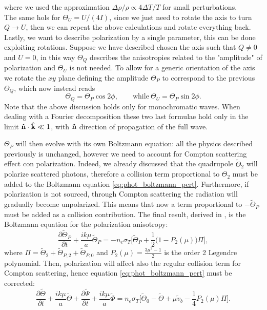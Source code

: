 where we used the approximation $\Delta\rho/\rho\propto4\Delta T/T$ for small perturbations.\\The same hols for $\Theta_U=U/(4I)$, since we just need to rotate the axis to turn $Q\rightarrow U$, then we can repeat the above calculations and rotate everything back.\\ Lastly, we want to describe polarization by a single parameter, this can be done exploiting rotations. Suppose we have described chosen the axis such that $Q\neq0$ and $U=0$, in this way $\Theta_Q$ describes the anisotropies related to the "amplitude" of polarization and $\Theta_U$ is not needed. To allow for a generic orientation of the axis we rotate the $xy$ plane defining the amplitude $\Theta_P$ to correspond to the previous $\Theta_Q$, which now instead reads
$$\Theta_Q=\Theta_P\cos2\phi,\qquad\text{while}\  \Theta_U=\Theta_P\sin2\phi.$$
Note that the above discussion holds only for monochromatic waves. When dealing with a Fourier decomposition these two last formulae hold only in the limit $\mathbf{\hat{n}}\cdot\mathbf{\hat{k}}\ll1$, with $\mathbf{\hat{n}}$ direction of propagation of the full wave.

$\Theta_P$ will then evolve with its own Boltzmann equation:
all the physics described previously is unchanged, however we need to account for Compton scattering effect con polarization. Indeed, we already discussed that the quadrupole $\tilde{\Theta}_2$ will polarize scattered photons, therefore a collision term proportional to $\Theta_2$ must be added to the Boltzmann equation \eqref{eq:phot_boltzmann_pert}. Furthermore, if polarization is not sourced, through Compton scattering the radiation will gradually become unpolarized. This means that now a term proportional to $-\tilde{\Theta}_P$ must be added as a collision contribution. The final result, derived in \cite{10.1093/mnras/226.3.655}, is the Boltzmann equation for the polarization anisotropy:
\begin{equation}\label{eq:ThetaP_Boltzmann}
    \frac{\partial \tilde\Theta_P}{\partial t}+\frac{ik\mu}{a}\tilde\Theta_P=-n_e\sigma_T\bigg[\tilde\Theta_{P}+\frac{1}{2}\bigg(1-P_2(\mu)\bigg)\Pi\bigg],
\end{equation}
where $\Pi=\tilde\Theta_2+\tilde\Theta_{P,2}+\tilde\Theta_{P,0}$ and $P_2(\mu)=\frac{3\mu^2-1}{2}$ is the order 2 Legendre polynomial.
Then, polarization will affect also the regular collision term for Compton scattering, hence equation \eqref{eq:phot_boltzmann_pert} must be corrected:
\begin{equation}\label{eq:phot_boltzmann_pert_pol}
    \frac{\partial \tilde\Theta}{\partial t} +\frac{ik\mu}{a}\tilde\Theta+\frac{\partial \tilde\Psi}{\partial t}+\frac{ik\mu}{a}\tilde\Phi=n_e \sigma_T\Bigg[\tilde\Theta_0-\tilde\Theta+\mu\tilde v_b-\frac{1}{4}P_2(\mu)\Pi\Bigg].
\end{equation}
